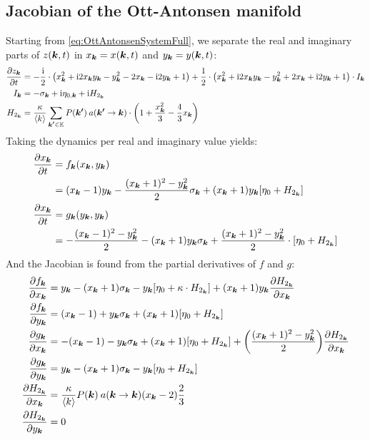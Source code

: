 \subsection{Jacobian of the Ott-Antonsen manifold}
Starting from \eqref{eq:OttAntonsenSystemFull}, we separate the real and imaginary parts of $z({\boldsymbol{k}}, t)$ in $x_{{\boldsymbol{k}}} = x({\boldsymbol{k}}, t)$ and $y_{{\boldsymbol{k}}} = y({\boldsymbol{k}}, t)$:
\begin{align*}
\frac{\partial z_{\k}}{\partial t} &= -\frac{\ic}{2} \cdot \left( x_{\k}^2 + \ic 2x_{\k}y_{\k} - y_{\k}^2 - 2x_{\k} - \ic 2y_{\k} +1\right) + \frac{1}{2} \cdot \left( x_{\k}^2 + \ic 2x_{\k}y_{\k} - y_{\k}^2 + 2x_{\k} + \ic 2y_{\k} +1 \right) \cdot I_{\k}\\
I_{\k} &= -\sigma_{\k} + \ic \eta_{0, \k} + \ic H_{2_{\k}} \\
H_{2_{\k}} &= \frac{\kappa}{\kmean} \sum_{\kacc \in \K} P\left(\kacc\right) \: a\left(\kacc \rightarrow \k\right) \cdot \left( 1 + \frac{x_{\k}^2}{3} - \frac{4}{3} x_{\k} \right)
\end{align*}
Taking the dynamics per real and imaginary value yields:
\begin{align*}
\frac{\partial x_{\k}}{\partial t}
&=f_{\k} \left(x_{\k}, y_{\k} \right) \\ 
&=(x_{\k}-1) y_{\k}-\frac{(x_{\k}+1)^{2}-y_{\k}^{2}}{2} \sigma_{\k} + (x_{\k}+1) y_{\k} \left[\eta_{0}+ H_{2_{\k}}\right] \\ 
\frac{\partial x_{\k}}{\partial t}
&= g_{\k} \left(y_{\k}, y_{\k} \right) \\ 
&=-\frac{(x_{\k}-1)^{2}-y_{\k}^{2}}{2}-(x_{\k}+1) y_{\k} \sigma_{\k} + \frac{(x_{\k}+1)^{2}-y_{\k}^{2}}{2} \cdot \left[\eta_{0} + H_{2_{\k}} \right] 
\end{align*}
And the Jacobian is found from the partial derivatives of $f$ and $g$:
\begin{align*}
\frac{\partial f_{\k}}{\partial x_{\k}} &= y_{\k}-(x_{\k}+1) \sigma_{\k}-y_{\k} \left[\eta_{0} + \kappa \cdot H_{2_{\k}} \right] + (x_{\k}+1) y_{\k} \frac{\partial H_{2_{\k}}}{\partial x_{\k}}\\
\frac{\partial f_{\k}}{\partial y_{\k}} &= (x_{\k}-1)+y_{\k} \sigma_{\k} + (x_{\k}+1) \left[\eta_{0} + H_{2_{\k}} \right] \\
\frac{\partial g_{\k}}{\partial x_{\k}} &= -(x_{\k} - 1) - y_{\k}  \sigma_{\k} + (x_{\k} + 1) \left[\eta_{0} + H_{2_{\k}} \right] + \left( \frac{(x_{\k} + 1)^2 - y_{\k}^2}{2} \right) \frac{\partial H_{2_{\k}}}{\partial x_{\k}} \\
\frac{\partial g_{\k}}{\partial y_{\k}} &= y_{\k} - (x_{\k} + 1) \sigma_{\k} - y_{\k} \left[\eta_{0} + H_{2_{\k}} \right] \\
\frac{\partial H_{2_{\k}}}{\partial x_{\k}} &= \frac{\kappa}{\langle k\rangle} P\left(\k\right) \: a\left(\k \rightarrow \k\right) (x_{\k}-2) \frac{2}{3} \\
\frac{\partial H_{2_{\k}}}{\partial y_{\k}} &= 0 
\end{align*}

